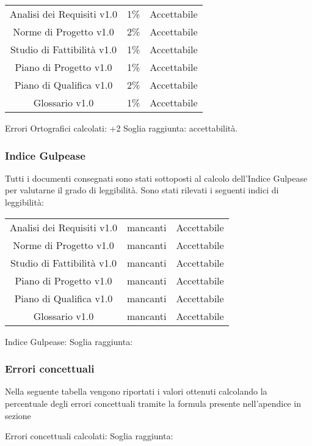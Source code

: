\begin{center}
	\begin{tabular}{| c | C{1cm} | C{3cm} |}
		Analisi dei Requisiti v1.0 & 1\% & Accettabile \\
		Norme di Progetto v1.0 & 2\% & Accettabile\\
		Studio di Fattibilità v1.0 & 1\% &  Accettabile \\
		Piano di Progetto v1.0 & 1\% & Accettabile \\
		Piano di Qualifica v1.0 & 2\% & Accettabile\\
		Glossario v1.0 & 1\% & Accettabile\\
	\end{tabular}
\end{center}

Errori Ortografici calcolati: +2%
Soglia raggiunta: accettabilità.


\subsubsection{Indice Gulpease}

Tutti i documenti consegnati sono stati sottoposti al calcolo dell'Indice Gulpease per valutarne il grado di leggibilità.
Sono stati rilevati i seguenti indici di leggibilità:

\begin{center}
	\begin{tabular}{| c | C{3cm} | C{3cm} |}
		Analisi dei Requisiti v1.0 &  mancanti & Accettabile \\
		Norme di Progetto v1.0 & mancanti & Accettabile\\
		Studio di Fattibilità v1.0 & mancanti & Accettabile\\ 
		Piano di Progetto v1.0 & mancanti & Accettabile \\
		Piano di Qualifica v1.0 & mancanti & Accettabile\\
		Glossario v1.0 & mancanti & Accettabile\\
	 \end{tabular}
\end{center}

Indice Gulpease:
Soglia raggiunta:

\subsubsection{Errori concettuali}

Nella seguente tabella vengono riportati i valori ottenuti calcolando la percentuale degli errori concettuali tramite la formula presente nell'apendice in sezione ~


Errori concettuali calcolati:
Soglia raggiunta:
